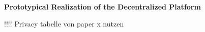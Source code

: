 \textbf{Prototypical Realization of the Decentralized Platform}

!!!! Privacy tabelle von paper x nutzen 
